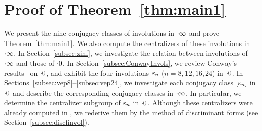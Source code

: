 \documentclass{amsart} %
\begin{document}
\section{Proof of Theorem~\ref{thm:main1}}\label{sec:proofofmain1}
%
We present the nine conjugacy classes of involutions in $\cdot \infty$
and prove Theorem~\ref{thm:main1}.  
We also compute the centralizers of these involutions in $\cdot \infty$.
In Section~\ref{subsec:zinf}, 
we investigate the relation between involutions of $\cdot \infty$ and those of $\cdot 0$.
In Section~\ref{subsec:ConwayInvols}, 
we review Conway's results~\cite[Chapter 10]{theCSbook} on $\cdot 0$, and 
exhibit the four involutions $\varepsilon_n$ ($n=8,12,16,24$) 
 in $\cdot 0$.
 In Sections~\ref{subsec:vep8}--\ref{subsec:vep24}, 
 we investigate each conjugacy class $[\varepsilon_n]$ in $\cdot 0$ and describe the corresponding conjugacy classes in $\cdot \infty$. 
In particular, 
we determine the centralizer subgroup of $\varepsilon_n$ in $\cdot 0$. 
Although these centralizers were already computed in \cite[Chapter~10]{theCSbook}, 
we rederive them by the method of discriminant forms
 (see Section~\ref{subsec:discfinvol}).
%
%
\end{document}
